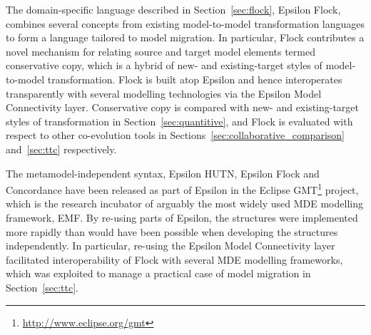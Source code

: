 The domain-specific language described in Section~\ref{sec:flock}, Epsilon Flock, combines several concepts from existing model-to-model transformation languages to form a language tailored to model migration. In particular, Flock contributes a novel mechanism for relating source and target model elements termed conservative copy, which is a hybrid of new- and existing-target styles of model-to-model transformation. Flock is built atop Epsilon and hence interoperates transparently with several modelling technologies via the Epsilon Model Connectivity layer. Conservative copy is compared with new- and existing-target styles of transformation in Section~\ref{sec:quantitive}, and Flock is evaluated with respect to other co-evolution tools in Sections~\ref{sec:collaborative_comparison} and~\ref{sec:ttc} respectively.

The metamodel-independent syntax, Epsilon HUTN, Epsilon Flock and Concordance have been released as part of Epsilon in the Eclipse GMT\footnote{\url{http://www.eclipse.org/gmt}} project, which is the research incubator of arguably the most widely used MDE modelling framework, EMF. By re-using parts of Epsilon, the structures were implemented more rapidly than would have been possible when developing the structures independently. In particular, re-using the Epsilon Model Connectivity layer facilitated interoperability of Flock with several MDE modelling frameworks, which was exploited to manage a practical case of model migration in Section~\ref{sec:ttc}.
